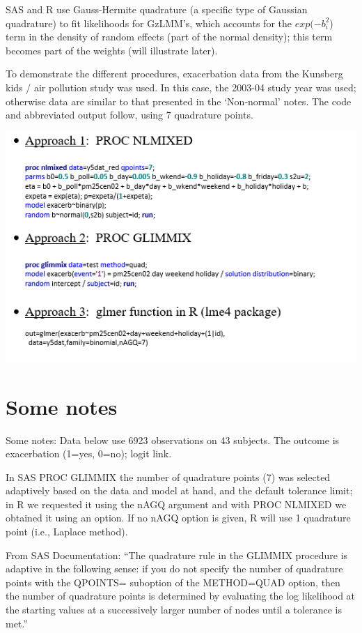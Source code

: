 \documentclass[
  9pt,
  ignorenonframetext,
]{beamer}
\begin{document}
\begin{frame}{}
\protect\hypertarget{section-3}{}
SAS and R use Gauss-Hermite quadrature (a specific type of Gaussian
quadrature) to fit likelihoods for GzLMM's, which accounts for the
\(exp⁡(-b_i^2\)) term in the density of random effects (part of the
normal density); this term becomes part of the weights (will illustrate
later).

To demonstrate the different procedures, exacerbation data from the
Kunsberg kids / air pollution study was used. In this case, the 2003-04
study year was used; otherwise data are similar to that presented in the
`Non-normal' notes. The code and abbreviated output follow, using 7
quadrature points.

\begin{center}\includegraphics[width=0.7\linewidth]{figs_L15/f1} \end{center}
\end{frame}

\hypertarget{some-notes}{%
\section{Some notes}\label{some-notes}}

\begin{frame}{Some notes:}
\protect\hypertarget{some-notes-1}{}
Data below use 6923 observations on 43 subjects. The outcome is
exacerbation (1=yes, 0=no); logit link.

In SAS PROC GLIMMIX the number of quadrature points (7) was selected
adaptively based on the data and model at hand, and the default
tolerance limit; in R we requested it using the nAGQ argument and with
PROC NLMIXED we obtained it using an option. If no nAGQ option is given,
R will use 1 quadrature point (i.e., Laplace method).

From SAS Documentation: ``The quadrature rule in the GLIMMIX procedure
is adaptive in the following sense: if you do not specify the number of
quadrature points with the QPOINTS= suboption of the METHOD=QUAD option,
then the number of quadrature points is determined by evaluating the log
likelihood at the starting values at a successively larger number of
nodes until a tolerance is met.''
\end{frame}
\end{document}
